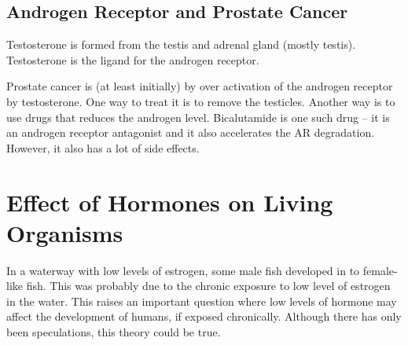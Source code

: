 \subsection{Androgen Receptor and Prostate Cancer}

Testosterone is formed from the testis and adrenal gland (mostly testis).
Testosterone is the ligand for the androgen receptor.

Prostate cancer is (at least initially) by over activation of the androgen receptor by testosterone.
One way to treat it is to remove the testicles.
Another way is to use drugs that reduces the androgen level.
Bicalutamide is one such drug -- it is an androgen receptor antagonist and it also accelerates the AR degradation.
However, it also has a lot of side effects.

\section{Effect of Hormones on Living Organisms}

In a waterway with low levels of estrogen, some male fish developed in to female-like fish.
This was probably due to the chronic exposure to low level of estrogen in the water.
This raises an important question where low levels of hormone may affect the development of humans, if exposed chronically.
Although there has only been speculations, this theory could be true.



















